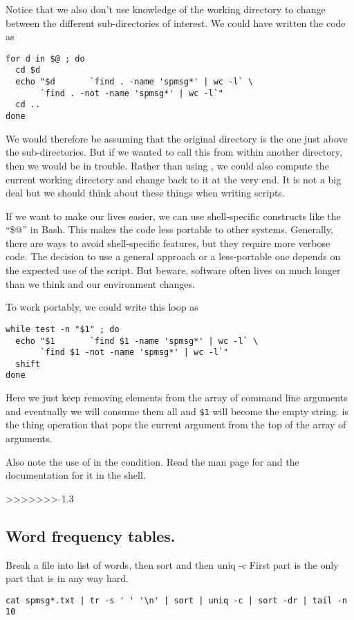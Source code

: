 Notice that we also don't use knowledge of the working directory
to change between the different sub-directories of interest.
We could have written the code as
\begin{verbatim}
for d in $@ ; do
  cd $d
  echo "$d       `find . -name 'spmsg*' | wc -l` \
       `find . -not -name 'spmsg*' | wc -l`"
  cd ..
done
\end{verbatim}
We would therefore be assuming that the original directory is
the one just above  the sub-directories.
But if we wanted to call this from within another directory,
then we would be in trouble.
Rather than using , we could also compute the current
working directory and change back to it at the very end.
It is not a big deal but we should think about these
things when writing scripts.


If we want to make our lives easier,
we can use shell-specific constructs
like the ``\$@'' in Bash.
This makes the code less portable to other systems.
Generally, there are ways to avoid shell-specific
features, but they require more verbose code.
The decision to use a general approach or a less-portable
one depends on the expected use of the script.
But beware, software often lives on much longer than
we think and our environment changes.

To work portably, we could write this loop as
\begin{verbatim}
while test -n "$1" ; do
  echo "$1       `find $1 -name 'spmsg*' | wc -l` \
       `find $1 -not -name 'spmsg*' | wc -l`" 
  shift
done
\end{verbatim}
Here we just keep removing elements from the array of command line
arguments and eventually we will consume them all
and \verb+$1+ will become the empty string.
\shellKey{shift} is the thing operation that pops the current
argument from the top of the array of arguments.

Also note the use of  in the condition.
Read the man page for  and the documentation
for it in the shell.




>>>>>>> 1.3


\subsection{Word frequency tables.}
Break a file into list of words,
then sort and then  uniq -c
First part is the only part that is in any way hard.

\begin{verbatim}
cat spmsg*.txt | tr -s ' ' '\n' | sort | uniq -c | sort -dr | tail -n 10
\end{verbatim}

